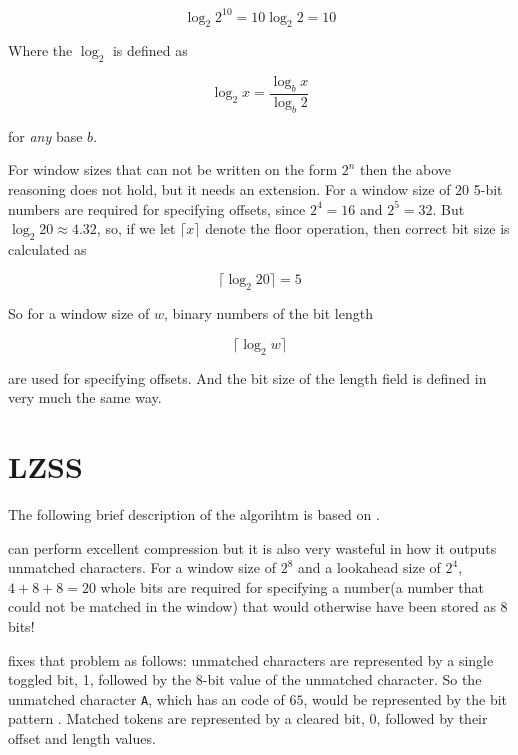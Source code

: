 \begin{equation*}
  \log_2 2^{10} = 10\log_2 2 = 10
\end{equation*}

Where the $\log_2$ is defined as

\begin{equation*}
  \log_2x = \frac{\log_b x}{\log_b 2}
\end{equation*}

for \textit{any} base $b$.

For window sizes that can not be written on the form $2^n$ then the
above reasoning does not hold, but it needs an extension. For a window
size of $20$ 5-bit numbers are required for specifying offsets, since
$2^4 = 16$ and $2^5 = 32$. But $\log_2 20 \approx 4.32$, so, if we let
$\lceil x \rceil$ denote the floor operation, then correct bit size is
calculated as

\begin{equation*}
  \lceil\log_2 20\rceil = 5
\end{equation*}

So for a window size of $w$, binary numbers of the bit length

\begin{equation*}
  \lceil\log_2 w\rceil
\end{equation*}

are used for specifying offsets. And the bit size of the length field
is defined in very much the same way.

\section{LZSS}

The following brief description of the \lzss algorihtm is based on
\cite{Salomon:2004:DCC,mark1996data_compression_book,mcfadden92:_hackin_data_compr_lzss,okumura:_data_compr_algor_larc_lharc}.

\lzone can perform excellent compression but it is also very wasteful
in how it outputs unmatched characters. For a window size of $2^8$ and
a lookahead size of $2^4$, $4 + 8 + 8 = 20$ whole bits are required
for specifying a number(a number that could not be matched in the
window) that would otherwise have been stored as 8 bits!

\lzss fixes that problem as follows: unmatched characters are
represented by a single toggled bit, 1, followed by the 8-bit value of
the unmatched character. So the unmatched character \texttt{A}, which
has an \ascii code of $65$, would be represented by the bit pattern
. Matched tokens are represented by a cleared bit,
0, followed by their offset and length values.

